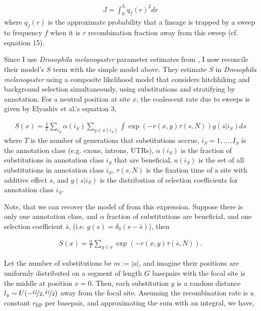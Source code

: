 \documentclass[11pt]{article}
\begin{document}
\begin{align}
  J = \int_0^L q_f(r)^2 dr 
\end{align}
%
where $q_f(r)$ is the approximate probability that a lineage is trapped by a
sweep to frequency $f$ when it is $r$ recombination fraction away from this
sweep (cf. \cite{Coop2012-cd} equation 15). 

Since I use \emph{Drosophila melanogaster} parameter estimates from
\textcite{Elyashiv2016-vt}, I now reconcile their model's $S$ term with the
simple model above. They estimate $S$ in \emph{Drosophila melanogaster} using a
composite likelihood model that considers hitchhiking and background selection
simultaneously, using substitutions and stratifying by annotation.  For a
neutral position at site $x$, the coalescent rate due to sweeps is given by
Elyashiv et al.'s equation 3, 

\begin{align}
  S(x) = \frac{1}{T} \sum_{i_S} \alpha(i_S) \sum_{y \in a(i_S)} \int \exp(-r(x, y) \tau(s, N)) g(s | i_S) ds
\end{align}
%
where $T$ is the number of generations that substitutions accrue, $i_S = 1,
\ldots, I_S$ is the annotation class (e.g. exons, introns, UTRs), $\alpha(i_S)$
is the fraction of substitutions in annotation class $i_S$ that are beneficial,
$a(i_S)$ is the set of all substitutions in annotation class $i_S$, $\tau(s,
N)$ is the fixation time of a site with additive effect $s$, and $g(s | i_S)$
is the distribution of selection coefficients for annotation class $i_S$. 

Note, that we can recover the model of \textcite{Coop2012-cd} from this
expression. Suppose there is only one annotation class, and $\alpha$ fraction
of substitutions are beneficial, and one selection coefficient $\bar{s}$, (i.e.
$g(s) = \delta_0(s - \bar{s})$), then

\begin{align}
  S(x) = \frac{\alpha}{T} \sum_{y \in {a}} \exp(-r(x,y)\tau(\bar{s}, N)).
\end{align}
%

Let the number of substitutions be $m := |a|$, and imagine their positions are
uniformly distributed on a segment of length $G$ basepairs with the focal site
is the middle at position $x=0$. Then, each substitution $y$ is a random
distance $l_y \sim U(-\nicefrac{G}{2}, \nicefrac{G}{2})$ away from the focal
site. Assuming the recombination rate is a constant $r_\text{BP}$ per
basepair, and approximating the sum with an integral, we have,
\end{document}
